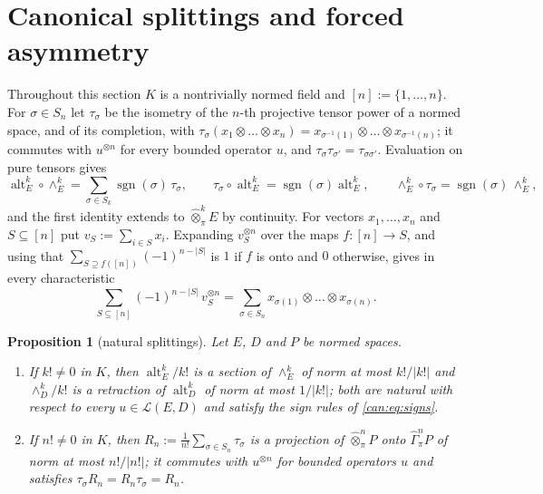 \documentclass[11pt]{amsart}
\newtheorem{proposition}[theorem]{Proposition}
\theoremstyle{definition}
\theoremstyle{remark}
\numberwithin{equation}{section}
\newcommand{\cL}{\mathcal L}
\newcommand{\sgn}{\operatorname{sgn}}
\newcommand{\abs}[1]{\lvert #1\rvert}
\theoremstyle{plain}
\theoremstyle{definition}
\theoremstyle{plain}
\begin{document}
\section{Canonical splittings and forced asymmetry}\label{sec:canonical}

Throughout this section $K$ is a nontrivially normed field and $[n]:=\{1,\dots,n\}$. For $\sigma\in S_n$ let
$\tau_\sigma$ be the isometry of the $n$\nobreakdash-th projective tensor power of a normed space, and of its completion,
with $\tau_\sigma(x_1\otimes\dots\otimes x_n)=x_{\sigma^{-1}(1)}\otimes\dots\otimes x_{\sigma^{-1}(n)}$; it commutes with
$u^{\otimes n}$ for every bounded operator $u$, and $\tau_\sigma\tau_{\sigma'}=\tau_{\sigma\sigma'}$. Evaluation on pure
tensors gives
\begin{equation}\label{can:eq:signs}
 \operatorname{alt}^k_E\circ\wedge^k_E=\sum_{\sigma\in S_k}\sgn(\sigma)\,\tau_\sigma,\qquad
 \tau_\sigma\circ\operatorname{alt}^k_E=\sgn(\sigma)\operatorname{alt}^k_E,\qquad
 \wedge^k_E\circ\tau_\sigma=\sgn(\sigma)\,\wedge^k_E ,
\end{equation}
and the first identity extends to $\widehat\otimes^k_\pi E$ by continuity. For vectors $x_1,\dots,x_n$ and
$S\subseteq[n]$ put $v_S:=\sum_{i\in S}x_i$. Expanding $v_S^{\otimes n}$ over the maps $f\colon[n]\to S$, and using that
$\sum_{S\supseteq f([n])}(-1)^{n-\abs S}$ is $1$ if $f$ is onto and $0$ otherwise, gives in every characteristic
\begin{equation}\label{can:eq:polarization}
 \sum_{S\subseteq[n]}(-1)^{n-\abs S}\,v_S^{\otimes n}=\sum_{\sigma\in S_n}x_{\sigma(1)}\otimes\dots\otimes x_{\sigma(n)} .
\end{equation}

\begin{proposition}[natural splittings]\label{can:prop:natural}
Let $E$, $D$ and $P$ be normed spaces.
\begin{enumerate}
\item If $k!\ne0$ in $K$, then $\operatorname{alt}^k_E/k!$ is a section of $\wedge^k_E$ of norm at most $k!/\abs{k!}$ and
$\wedge^k_D/k!$ is a retraction of $\operatorname{alt}^k_D$ of norm at most $1/\abs{k!}$; both are natural with respect
to every $u\in\cL(E,D)$ and satisfy the sign rules of \eqref{can:eq:signs}.
\item If $n!\ne0$ in $K$, then $R_n:=\frac1{n!}\sum_{\sigma\in S_n}\tau_\sigma$ is a projection of
$\widehat\otimes^n_\pi P$ onto $\widehat\Gamma^n_\pi P$ of norm at most $n!/\abs{n!}$; it commutes with $u^{\otimes n}$ for
bounded operators $u$ and satisfies $\tau_\sigma R_n=R_n\tau_\sigma=R_n$.
\end{enumerate}
\end{proposition}
\end{document}
